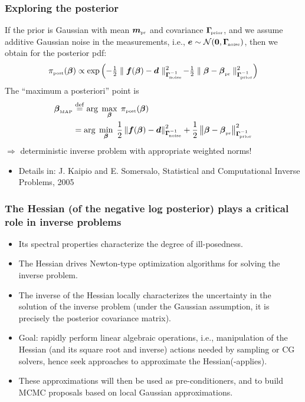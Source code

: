 \documentclass[10pt,final,xcolor=dvipsnames]{beamer}
\renewcommand{\vec}[1]{{\mathchoice
                     {\mbox{\boldmath$\displaystyle{#1}$}}
                     {\mbox{\boldmath$\textstyle{#1}$}}
                     {\mbox{\boldmath$\scriptstyle{#1}$}}
                     {\mbox{\boldmath$\scriptscriptstyle{#1}$}}}}
\newcommand{\bdm} {\begin{displaymath}}
\newcommand{\edm} {\end{displaymath}}
\newcommand{\dobs}{{\vec{d}}}
\newcommand{\post}{\pi_{\mbox{\tiny post}}}
\newcommand{\ncov} {\bs{\Gamma}_{\!\mbox{\tiny noise}} }
\newcommand{\prcov} {\bs{\Gamma}_{\!\mbox{\tiny prior}} }
\newcommand{\mpr} {{\vec{m}}_{\mbox{\tiny pr}} }
\newcommand{\gbf}[1]{\boldsymbol{#1}}
\newcommand{\bs}[1]{\ensuremath{\boldsymbol{#1}}}
\renewcommand{\vec}[1]{\gbf{#1}}
\begin{document}
\begin{frame}
  \frametitle{Exploring the posterior}

  If the prior is Gaussian with mean $\mpr$ and covariance $\prcov$,
  and we assume additive Gaussian noise in the measurements, i.e.,
  $\bs{e} \sim \mathcal{N}(\bs{0}, \ncov )$, then we obtain for the
  posterior pdf:
  \bdm
  \post(\bs{\beta})  \propto
  \exp \left( - \tfrac{1}{2} \parallel \bs{f}(\bs{\beta}) -
  \bs{d}_{\mbox{\tiny}}
  \parallel^{2}_{\ncov^{-1}} \!
  - \tfrac{1}{2}\parallel \bs{\beta} - \bs{\beta}_{\mbox{\tiny pr}}
  \parallel^{2}_{\prcov^{-1}}
  \right)
  \edm
  \vspace{0.2cm}
  The ``maximum a posteriori'' point is
  \begin{alignat*}{2}
    \bs{\beta}_{\mbox{\tiny MAP}}& \stackrel{\mathrm{def}}{=} \arg \;
    \max_{\bs \beta} \; \pi_{\mbox{\tiny post}}(\bs{\beta})
    \\
    &= \arg \;
    \min_{\bs \beta} \; \frac{1}{2} \left\|  \bs{f}(\bs{\beta}) -\dobs
    \right\|^2_{\ncov^{-1}}
    + \frac{1}{2} \left\|{\bs{\beta} - \bs{\beta}_{\mbox{\tiny pr}}}\right\|^2_{\prcov^{-1}}
  \end{alignat*}
  $\Rightarrow$ deterministic inverse problem with appropriate weighted norms!
  \vspace{1cm}
  \begin{itemize}
  \item [] \scriptsize{Details in: J. Kaipio and E. Somersalo, Statistical and Computational Inverse Problems, 2005}
  \end{itemize}
\end{frame}
\begin{frame}
  \frametitle{The Hessian (of the negative log posterior) plays a
    critical role in inverse problems}
  \begin{itemize}
  \item Its spectral properties characterize the degree of
    ill-posedness.
  \item The Hessian drives Newton-type optimization algorithms for
    solving the inverse problem.
  \item The inverse of the Hessian locally characterizes the uncertainty
    in the solution of the inverse problem (under the Gaussian
    assumption, it is precisely the posterior covariance matrix).
  \item \alert{Goal:} rapidly perform linear algebraic operations, i.e.,
    manipulation of the Hessian (and its square root and inverse)
    actions needed by sampling or CG solvers, hence \alert{seek
      approaches to approximate the Hessian(-applies)}.
  \item These approximations will then be used as
    \alert{pre-conditioners}, and to \alert{build MCMC proposals} based
    on local Gaussian approximations.
  \end{itemize}
\end{frame}
\end{document}
